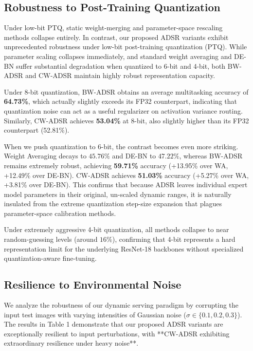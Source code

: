 \documentclass{article}
\theoremstyle{plain}
\theoremstyle{definition}
\theoremstyle{remark}
\begin{document}
\subsection{Robustness to Post-Training Quantization}
Under low-bit PTQ, static weight-merging and parameter-space rescaling methods collapse entirely. In contrast, our proposed ADSR variants exhibit unprecedented robustness under low-bit post-training quantization (PTQ). While parameter scaling collapses immediately, and standard weight averaging and DE-BN suffer substantial degradation when quantized to 6-bit and 4-bit, both BW-ADSR and CW-ADSR maintain highly robust representation capacity.

Under 8-bit quantization, BW-ADSR obtains an average multitasking accuracy of \textbf{64.73\%}, which actually slightly exceeds its FP32 counterpart, indicating that quantization noise can act as a useful regularizer on activation variance routing. Similarly, CW-ADSR achieves \textbf{53.04\%} at 8-bit, also slightly higher than its FP32 counterpart (52.81\%).

When we push quantization to 6-bit, the contrast becomes even more striking. Weight Averaging decays to $45.76\%$ and DE-BN to $47.22\%$, whereas BW-ADSR remains extremely robust, achieving \textbf{59.71\%} accuracy (+13.95\% over WA, +12.49\% over DE-BN). CW-ADSR achieves \textbf{51.03\%} accuracy (+5.27\% over WA, +3.81\% over DE-BN). This confirms that because ADSR leaves individual expert model parameters in their original, un-scaled dynamic ranges, it is naturally insulated from the extreme quantization step-size expansion that plagues parameter-space calibration methods.

Under extremely aggressive 4-bit quantization, all methods collapse to near random-guessing levels (around $16\%$), confirming that 4-bit represents a hard representation limit for the underlying ResNet-18 backbones without specialized quantization-aware fine-tuning.

\subsection{Resilience to Environmental Noise}
We analyze the robustness of our dynamic serving paradigm by corrupting the input test images with varying intensities of Gaussian noise ($\sigma \in \{0.1, 0.2, 0.3\}$). The results in Table 1 demonstrate that our proposed ADSR variants are exceptionally resilient to input perturbations, with **CW-ADSR exhibiting extraordinary resilience under heavy noise**.
\end{document}
